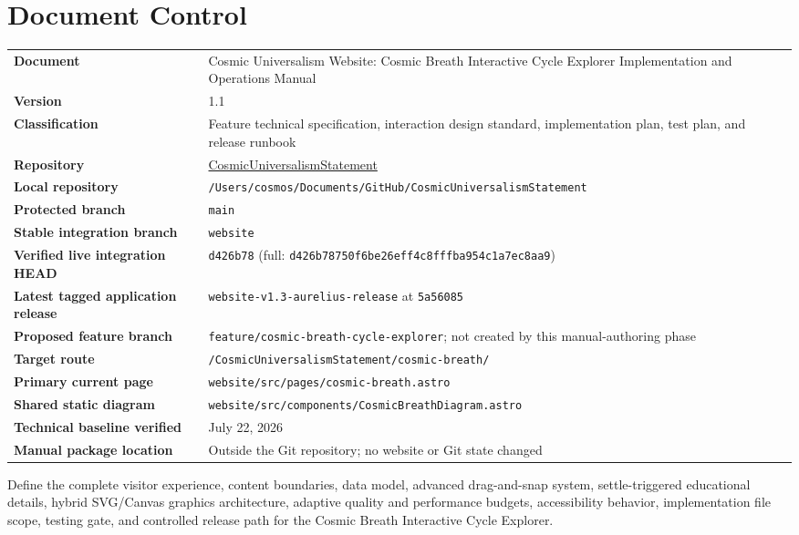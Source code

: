 \documentclass[11pt,letterpaper]{article}
\newcommand{\RepositoryName}{CosmicUniversalismStatement}
\newcommand{\RepositoryURL}{https://github.com/willmaddock/CosmicUniversalismStatement}
\newcommand{\LocalRepository}{/Users/cosmos/Documents/GitHub/CosmicUniversalismStatement}
\newcommand{\ProtectedBranch}{main}
\newcommand{\StableBranch}{website}
\newcommand{\LiveIntegrationHead}{d426b78}
\newcommand{\LiveIntegrationFullHead}{d426b78750f6be26eff4c8fffba954c1a7ec8aa9}
\newcommand{\CurrentReleaseTag}{website-v1.3-aurelius-release}
\newcommand{\CurrentReleaseCommit}{5a56085}
\newcommand{\ProposedFeatureBranch}{feature/cosmic-breath-cycle-explorer}
\newcommand{\TargetRoute}{/CosmicUniversalismStatement/cosmic-breath/}
\newcommand{\DocumentVersion}{1.1}
\newcommand{\VerificationDate}{July 22, 2026}
\newcommand{\filepath}[1]{\nolinkurl{#1}}
\newcommand{\branchname}[1]{\texttt{#1}}
\newcommand{\release}[1]{\texttt{#1}}
\begin{document}
\section*{Document Control}
\begin{tabularx}{\textwidth}{>{\bfseries}L{2.05in}Y}
Document & Cosmic Universalism Website: Cosmic Breath Interactive Cycle Explorer Implementation and Operations Manual \\
Version & \DocumentVersion \\
Classification & Feature technical specification, interaction design standard, implementation plan, test plan, and release runbook \\
Repository & \href{\RepositoryURL}{\RepositoryName} \\
Local repository & \filepath{\LocalRepository} \\
Protected branch & \branchname{\ProtectedBranch} \\
Stable integration branch & \branchname{\StableBranch} \\
Verified live integration HEAD & \release{\LiveIntegrationHead} (full: \release{\LiveIntegrationFullHead}) \\
Latest tagged application release & \release{\CurrentReleaseTag} at \release{\CurrentReleaseCommit} \\
Proposed feature branch & \branchname{\ProposedFeatureBranch}; not created by this manual-authoring phase \\
Target route & \filepath{\TargetRoute} \\
Primary current page & \filepath{website/src/pages/cosmic-breath.astro} \\
Shared static diagram & \filepath{website/src/components/CosmicBreathDiagram.astro} \\
Technical baseline verified & \VerificationDate \\
Manual package location & Outside the Git repository; no website or Git state changed \\
\end{tabularx}

\begin{purposebox}
Define the complete visitor experience, content boundaries, data model, advanced drag-and-snap system, settle-triggered educational details, hybrid SVG/Canvas graphics architecture, adaptive quality and performance budgets, accessibility behavior, implementation file scope, testing gate, and controlled release path for the Cosmic Breath Interactive Cycle Explorer.
\end{purposebox}
\end{document}
